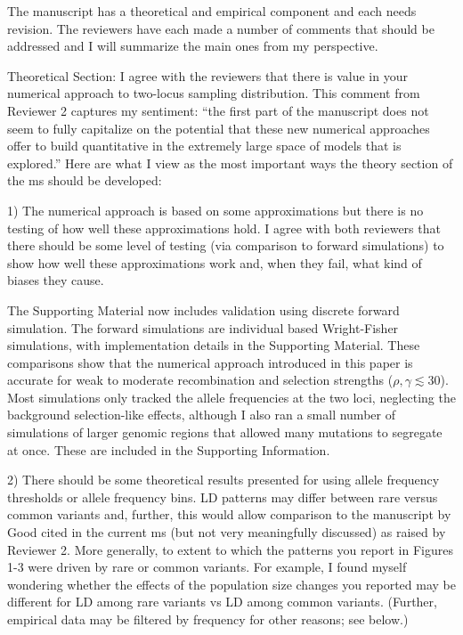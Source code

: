 \documentclass{article}
\newenvironment{response}%
  {\list{}{\leftmargin=0.5in\rightmargin=0.5in\color{blue}}\item[]}%
  {\endlist}
\begin{document}
The manuscript has a theoretical and empirical component and each needs
revision.  The reviewers have each made a number of comments that should be
addressed and I will summarize the main ones from my perspective.

Theoretical Section: I agree with the reviewers that there is value in your
numerical approach to two-locus sampling distribution. This comment from
Reviewer 2 captures my sentiment: ``the first part of the manuscript does not
seem to fully capitalize on the potential that these new numerical approaches
offer to build quantitative in the extremely large space of models that is
explored.'' Here are what I view as the most important ways the theory section
of the ms should be developed:

1) The numerical approach is based on some approximations but there is no
testing of how well these approximations hold. I agree with both reviewers that
there should be some level of testing (via comparison to forward simulations)
to show how well these approximations work and, when they fail, what kind of
biases they cause.

\begin{response}
    The Supporting Material now includes validation using discrete
    forward simulation. The forward simulations are individual based
    Wright-Fisher simulations, with implementation details in the Supporting
    Material. These comparisons show that the numerical approach introduced in
    this paper is accurate for weak to moderate recombination and selection
    strengths ($\rho, \gamma \lesssim 30$).
    Most simulations only tracked the allele frequencies at the two loci,
    neglecting the background selection-like effects,
    although I also ran a small number of simulations of larger genomic
    regions that allowed many mutations to segregate at once. These are included
    in the Supporting Information.
\end{response}

2) There should be some theoretical results presented for using allele
frequency thresholds or allele frequency bins. LD patterns may differ between
rare versus common variants and, further, this would allow comparison to the
manuscript by Good cited in the current ms (but not very meaningfully
discussed) as raised by Reviewer 2. More generally, to extent to which the
patterns you report in Figures 1-3 were driven by rare or common variants. For
example, I found myself wondering whether the effects of the population size
changes you reported may be different for LD among rare variants vs LD among
common variants. (Further, empirical data may be filtered by frequency for
other reasons; see below.)
\end{document}
